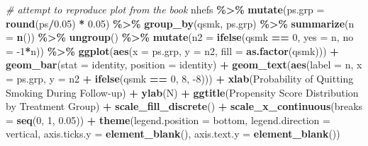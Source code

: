 \documentclass[
  10pt,
]{book}
\newenvironment{Shaded}{\begin{snugshade}}{\end{snugshade}}
\newcommand{\CommentTok}[1]{\textcolor[rgb]{0.56,0.35,0.01}{\textit{#1}}}
\newcommand{\DataTypeTok}[1]{\textcolor[rgb]{0.13,0.29,0.53}{#1}}
\newcommand{\DecValTok}[1]{\textcolor[rgb]{0.00,0.00,0.81}{#1}}
\newcommand{\FloatTok}[1]{\textcolor[rgb]{0.00,0.00,0.81}{#1}}
\newcommand{\KeywordTok}[1]{\textcolor[rgb]{0.13,0.29,0.53}{\textbf{#1}}}
\newcommand{\NormalTok}[1]{#1}
\newcommand{\OperatorTok}[1]{\textcolor[rgb]{0.81,0.36,0.00}{\textbf{#1}}}
\newcommand{\StringTok}[1]{\textcolor[rgb]{0.31,0.60,0.02}{#1}}
\begin{document}
\begin{Shaded}
\begin{Highlighting}[]
\CommentTok{\# attempt to reproduce plot from the book}
\NormalTok{nhefs }\OperatorTok{\%\textgreater{}\%}
\StringTok{  }\KeywordTok{mutate}\NormalTok{(}\DataTypeTok{ps.grp =} \KeywordTok{round}\NormalTok{(ps}\OperatorTok{/}\FloatTok{0.05}\NormalTok{) }\OperatorTok{*}\StringTok{ }\FloatTok{0.05}\NormalTok{) }\OperatorTok{\%\textgreater{}\%}
\StringTok{  }\KeywordTok{group\_by}\NormalTok{(qsmk, ps.grp) }\OperatorTok{\%\textgreater{}\%}
\StringTok{  }\KeywordTok{summarize}\NormalTok{(}\DataTypeTok{n =} \KeywordTok{n}\NormalTok{()) }\OperatorTok{\%\textgreater{}\%}
\StringTok{  }\KeywordTok{ungroup}\NormalTok{() }\OperatorTok{\%\textgreater{}\%}
\StringTok{  }\KeywordTok{mutate}\NormalTok{(}\DataTypeTok{n2 =} \KeywordTok{ifelse}\NormalTok{(qsmk }\OperatorTok{==}\StringTok{ }\DecValTok{0}\NormalTok{, }\DataTypeTok{yes =}\NormalTok{ n, }\DataTypeTok{no =}  \DecValTok{{-}1}\OperatorTok{*}\NormalTok{n)) }\OperatorTok{\%\textgreater{}\%}
\StringTok{  }\KeywordTok{ggplot}\NormalTok{(}\KeywordTok{aes}\NormalTok{(}\DataTypeTok{x =}\NormalTok{ ps.grp, }\DataTypeTok{y =}\NormalTok{ n2, }\DataTypeTok{fill =} \KeywordTok{as.factor}\NormalTok{(qsmk))) }\OperatorTok{+}
\StringTok{  }\KeywordTok{geom\_bar}\NormalTok{(}\DataTypeTok{stat =} \StringTok{\textquotesingle{}identity\textquotesingle{}}\NormalTok{, }\DataTypeTok{position =} \StringTok{\textquotesingle{}identity\textquotesingle{}}\NormalTok{) }\OperatorTok{+}
\StringTok{  }\KeywordTok{geom\_text}\NormalTok{(}\KeywordTok{aes}\NormalTok{(}\DataTypeTok{label =}\NormalTok{ n, }\DataTypeTok{x =}\NormalTok{ ps.grp, }\DataTypeTok{y =}\NormalTok{ n2 }\OperatorTok{+}\StringTok{ }\KeywordTok{ifelse}\NormalTok{(qsmk }\OperatorTok{==}\StringTok{ }\DecValTok{0}\NormalTok{, }\DecValTok{8}\NormalTok{, }\DecValTok{{-}8}\NormalTok{))) }\OperatorTok{+}
\StringTok{  }\KeywordTok{xlab}\NormalTok{(}\StringTok{\textquotesingle{}Probability of Quitting Smoking During Follow{-}up\textquotesingle{}}\NormalTok{) }\OperatorTok{+}
\StringTok{  }\KeywordTok{ylab}\NormalTok{(}\StringTok{\textquotesingle{}N\textquotesingle{}}\NormalTok{) }\OperatorTok{+}
\StringTok{  }\KeywordTok{ggtitle}\NormalTok{(}\StringTok{\textquotesingle{}Propensity Score Distribution by Treatment Group\textquotesingle{}}\NormalTok{) }\OperatorTok{+}
\StringTok{  }\KeywordTok{scale\_fill\_discrete}\NormalTok{(}\StringTok{\textquotesingle{}\textquotesingle{}}\NormalTok{) }\OperatorTok{+}
\StringTok{  }\KeywordTok{scale\_x\_continuous}\NormalTok{(}\DataTypeTok{breaks =} \KeywordTok{seq}\NormalTok{(}\DecValTok{0}\NormalTok{, }\DecValTok{1}\NormalTok{, }\FloatTok{0.05}\NormalTok{)) }\OperatorTok{+}
\StringTok{  }\KeywordTok{theme}\NormalTok{(}\DataTypeTok{legend.position =} \StringTok{\textquotesingle{}bottom\textquotesingle{}}\NormalTok{, }\DataTypeTok{legend.direction =} \StringTok{\textquotesingle{}vertical\textquotesingle{}}\NormalTok{,}
        \DataTypeTok{axis.ticks.y =} \KeywordTok{element\_blank}\NormalTok{(),}
        \DataTypeTok{axis.text.y =} \KeywordTok{element\_blank}\NormalTok{())}
\end{Highlighting}
\end{Shaded}
\end{document}
